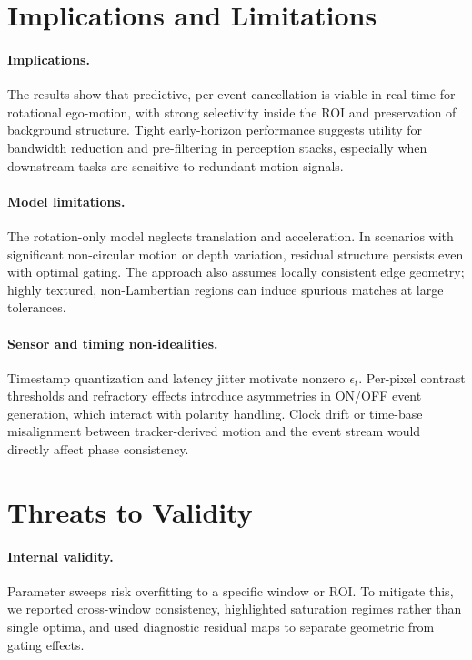 \section{Implications and Limitations}
\paragraph{Implications.} The results show that predictive, per-event cancellation is viable in real time for rotational ego-motion, with strong selectivity inside the ROI and preservation of background structure. Tight early-horizon performance suggests utility for bandwidth reduction and pre-filtering in perception stacks, especially when downstream tasks are sensitive to redundant motion signals.

\paragraph{Model limitations.} The rotation-only model neglects translation and acceleration. In scenarios with significant non-circular motion or depth variation, residual structure persists even with optimal gating. The approach also assumes locally consistent edge geometry; highly textured, non-Lambertian regions can induce spurious matches at large tolerances.

\paragraph{Sensor and timing non-idealities.} Timestamp quantization and latency jitter motivate nonzero $\epsilon_t$. Per-pixel contrast thresholds and refractory effects introduce asymmetries in ON/OFF event generation, which interact with polarity handling. Clock drift or time-base misalignment between tracker-derived motion and the event stream would directly affect phase consistency.

\section{Threats to Validity}
\paragraph{Internal validity.} Parameter sweeps risk overfitting to a specific window or ROI. To mitigate this, we reported cross-window consistency, highlighted saturation regimes rather than single optima, and used diagnostic residual maps to separate geometric from gating effects.

